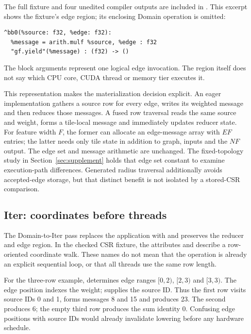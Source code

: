 The full fixture and four unedited compiler outputs are included in
. This excerpt shows the fixture's edge region; its
enclosing Domain operation is omitted:
\begin{lstlisting}[language=TigaIR]
^bb0(%source: f32, %edge: f32):
  %message = arith.mulf %source, %edge : f32
  "gf.yield"(%message) : (f32) -> ()
\end{lstlisting}
The block arguments represent one logical edge invocation. The region itself
does not say which CPU core, CUDA thread or memory tier executes it.

This representation makes the materialization decision explicit. An eager
implementation gathers a source row for every edge, writes its weighted
message and then reduces those messages. A fused row traversal reads the same
source and weight, forms a tile-local message and immediately updates reducer
state. For feature width $F$, the former can allocate an edge-message array
with $EF$ entries; the latter needs only tile state in addition to graph,
inputs and the $NF$ output. The edge set and message arithmetic are unchanged.
The fixed-topology study in Section~\ref{sec:supplement} holds that edge set
constant to examine execution-path differences. Generated radius traversal
additionally avoids accepted-edge storage, but that distinct benefit is not
isolated by a stored-CSR comparison.

\subsection{Iter: coordinates before threads}
The Domain-to-Iter pass replaces the application with 
and preserves the reducer and edge region. In the checked CSR fixture, the
attributes  and
 describe a row-oriented coordinate walk.
These names do not mean that the operation is already an explicit sequential
loop, or that all threads use the same row length.

For the three-row example,  determines edge ranges
$[0,2)$, $[2,3)$ and $[3,3)$. The edge position indexes the weight;
 supplies the source ID. Thus the first row visits source IDs
0 and 1, forms messages 8 and 15 and produces 23. The second produces 6; the
empty third row produces the sum identity 0. Confusing edge positions with
source IDs would already invalidate lowering before any hardware schedule.

